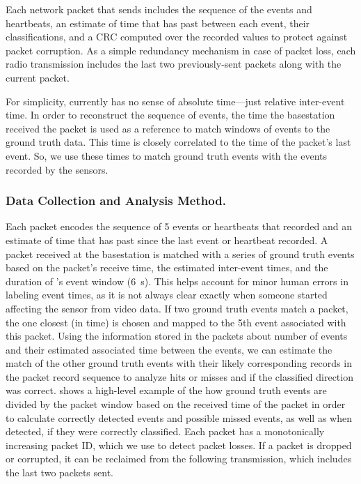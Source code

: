 Each network packet that \sysname sends includes the sequence of the events and heartbeats, an estimate of time that has past between each event, their classifications, and a CRC computed over the recorded values to protect against packet corruption. 
As a simple redundancy mechanism in case of packet loss, each radio transmission includes the last two previously-sent packets along with the current packet. 

For simplicity, \sysname currently has no sense of absolute time---just relative inter-event time.
In order to reconstruct the sequence of events, the time the basestation received the packet is used as a reference to match windows of events to the ground truth data.
This time is closely correlated to the time of the packet's last event.
So, we use these times to match ground truth events with the events recorded by the \sysname sensors.

\subsubsection{Data Collection and Analysis Method.}
Each packet encodes the sequence of 5 events or heartbeats that \sysname recorded and an estimate of time that has past since the last event or heartbeat recorded.
A packet received at the basestation is matched with a series of ground truth events based on the packet's receive time, the estimated inter-event times, and the duration of \sysname's event window (\SI{6}{\second}).  
This helps account for minor human errors in labeling event times, as it is not always clear exactly when someone started affecting the sensor from video data.
If two ground truth events match a packet, the one closest (in time) is chosen and mapped to the 5th event associated with this packet.
Using the information stored in the packets about number of events and their estimated associated time between the events, we can estimate the match of the other ground truth events with their likely corresponding records in the packet record sequence to analyze hits or misses and if the classified direction was correct.  
 shows a high-level example of the how ground truth events are divided by the packet window based on the received time of the packet in order to calculate correctly detected events and possible missed events, as well as when detected, if they were correctly classified. 
Each \sysname packet has a monotonically increasing packet ID, which we use to detect packet losses.
If a packet is dropped or corrupted, it can be reclaimed from the following transmission, which includes the last two packets sent. 
	
